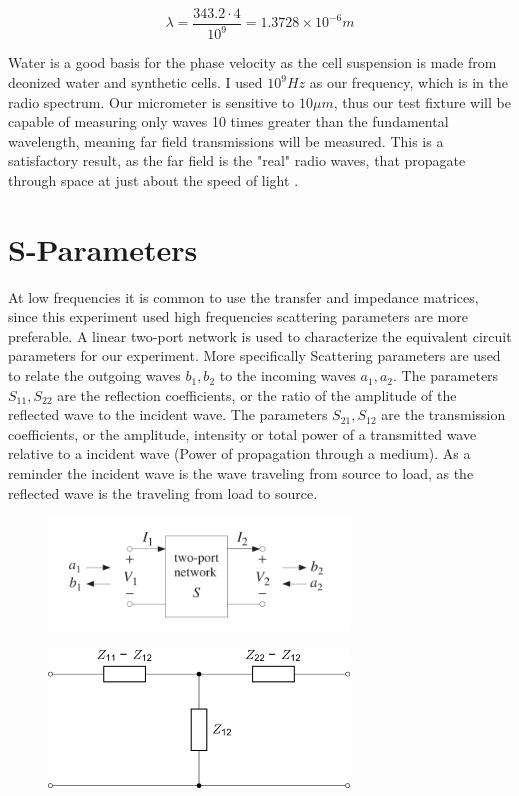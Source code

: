 \documentclass[journal]{IEEEtran}
\begin{document}
\begin{equation}
\label{near-wavelength-water}
\lambda = \frac{343.2 \cdot 4}{10^9} = 1.3728 \times 10^{-6} m
\end{equation}

Water is a good basis for the phase velocity as the cell suspension is made from deonized water and synthetic cells. I used $10^9 Hz$ as our frequency, which is in the radio spectrum. Our micrometer is sensitive to $10\mu m$, thus our test fixture will be capable of measuring only waves 10 times greater than the fundamental wavelength, meaning far field transmissions will be measured. This is a satisfactory result, as the far field is the "real" radio waves, that propagate through space at just about the speed of light \cite{near-far-em}. 

\section{S-Parameters}
At low frequencies it is common to use the transfer and impedance matrices, since this experiment used high frequencies scattering parameters are more preferable. A linear two-port network is used to characterize the equivalent circuit parameters for our experiment. More specifically Scattering parameters are used to relate the outgoing waves $b_1,b_2$ to the incoming waves $a_1,a_2$. The parameters $S_{11},S_{22}$ are the reflection coefficients, or the ratio of the amplitude of the reflected wave to the incident wave. The parameters $S_{21},S_{12}$ are the transmission coefficients, or the amplitude, intensity or total power of a transmitted wave relative to a incident wave (Power of propagation through a medium). As a reminder the incident wave is the wave traveling from source to load, as the reflected wave is the traveling from load to source.

\begin{figure}[ht]
\label{Equivalent_Circuit}
\includegraphics[width=8cm]{two_port.png}
\end{figure}

\begin{figure}[ht]
\label{Equivalent_Circuit}
\includegraphics[width=8cm]{Equivalent_Circuit.png}
\end{figure}
\end{document}
